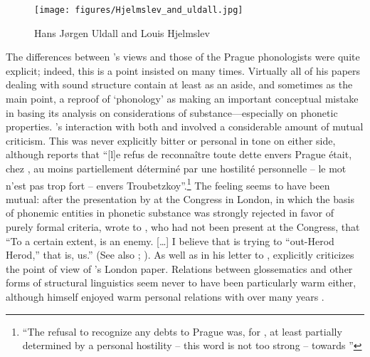 \begin{wrapfigure}[12]{r}{.5\textwidth}
  \texttt{[image: figures/Hjelmslev\_and\_uldall.jpg]}
  \caption{Hans Jørgen Uldall and Louis Hjelmslev}
  \label{fig:ch.hjelmslev.uldall-hjelmslev}
\end{wrapfigure}
The differences between {\Hjelmslev}'s views and those of the Prague
phonologists were quite explicit; indeed, this is a point {\Hjelmslev}
insisted on many times. Virtually all of his papers dealing with sound
structure contain at least as an aside, and sometimes as the main
point, a reproof of `phonology' as making an important conceptual
mistake in basing its analysis on considerations of
substance—especially on phonetic properties. {\Hjelmslev}'s interaction
with both {\Trubetzkoy} and {\Jakobson} involved a considerable amount of
mutual criticism. This was never explicitly bitter or personal in tone
on either side, although \citet[17]{martinet85:hjelmslev} reports that
``[l]e refus de reconnaître toute dette envers Prague était, chez
{\Hjelmslev}, au moins partiellement déterminé par une hostilité
personnelle – le mot n'est pas trop fort – envers
Troubetzkoy''.\footnote{``The refusal to recognize any debts to Prague
  was, for {\Hjelmslev}, at least partially determined by a personal
  hostility – this word is not too strong – towards {\Trubetzkoy}''} The
feeling seems to have been mutual: after the presentation by
\citet{hjelmslev.uldall35:phonematics} at the Congress in London, in
which the basis of phonemic entities in phonetic substance was
strongly rejected in favor of purely formal criteria, {\Trubetzkoy} wrote
\citep[248]{liberman01:trubetzkoy.anthology} to {\Jakobson}, who had not
been present at the Congress, that ``To a certain extent, {\Hjelmslev} is
an enemy. [\ldots] I believe that {\Hjelmslev} is trying to ``out-Herod
Herod,'' that is, us.''  (See also
\citealt[22]{early.years:efj-rj.letters};
\citealt[19]{efj97:jakobson}).  As well as in his letter to {\Jakobson},
\citet[83]{trubetzkoy39:grundzuge} explicitly criticizes the point of
view of {\Hjelmslev}'s London paper.  Relations between glossematics and
other forms of structural linguistics seem never to have been
particularly warm either, although {\Jakobson} himself enjoyed warm
personal relations with {\Hjelmslev} over many years
\citep{efj97:jakobson}.

